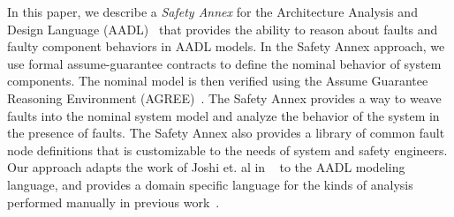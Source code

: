 In this paper, we describe a {\em Safety Annex} for the Architecture Analysis and Design Language (AADL)~\cite{FeilerModelBasedEngineering2012} that provides the ability to reason about faults and faulty component behaviors in AADL models. In the Safety Annex approach, we use formal assume-guarantee contracts to define the nominal behavior of system components. The nominal model is then verified using the Assume Guarantee Reasoning Environment (AGREE)~\cite{NFM2012:CoGaMiWhLaLu}. The Safety Annex  provides a way to weave faults into the nominal system model and analyze the behavior of the system in the presence of faults. The Safety Annex also provides a library of common fault node definitions that is customizable to the needs of system and safety engineers. Our approach adapts the work of Joshi et. al in
~\cite{Joshi05:Dasc} to the AADL modeling language, and provides a domain specific language for the kinds of analysis performed manually in previous work~\cite{Stewart17:IMBSA}.  %


